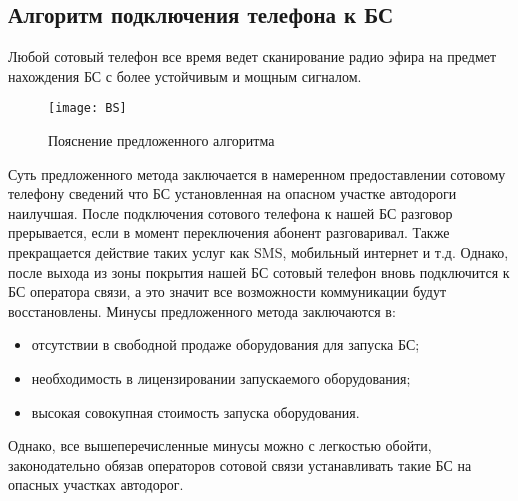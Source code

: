 \documentclass{article}
\begin{document}
	\subsection{Алгоритм подключения телефона к БС}

	Любой сотовый телефон все время ведет сканирование радио эфира на предмет нахождения БС с более устойчивым и мощным сигналом.

	\begin{figure}[tb]
		\centering
		\texttt{[image: BS]}
		\caption{Пояснение предложенного алгоритма}
		\label{fig:BS}
	\end{figure}

	Суть предложенного метода заключается в намеренном предоставлении сотовому телефону сведений что БС установленная на опасном участке автодороги наилучшая. После подключения сотового телефона к нашей БС разговор прерывается, если в момент переключения абонент разговаривал. Также прекращается действие таких услуг как SMS, мобильный интернет и т.д. Однако, после выхода из зоны покрытия нашей БС сотовый телефон вновь подключится к БС оператора связи, а это значит все возможности коммуникации будут восстановлены.
	Минусы предложенного метода заключаются в:
	\begin{itemize}
		\item отсутствии в свободной продаже оборудования для запуска БС;
		\item необходимость в лицензировании запускаемого оборудования;
		\item высокая совокупная стоимость запуска оборудования.
	\end{itemize}
	Однако, все вышеперечисленные минусы можно с легкостью обойти, законодательно обязав операторов сотовой связи устанавливать такие БС на опасных участках автодорог.



	\FloatBarrier
	\providecommand*{\BibDash}{}                %
	\insertbibliofull                           %
\end{document}

